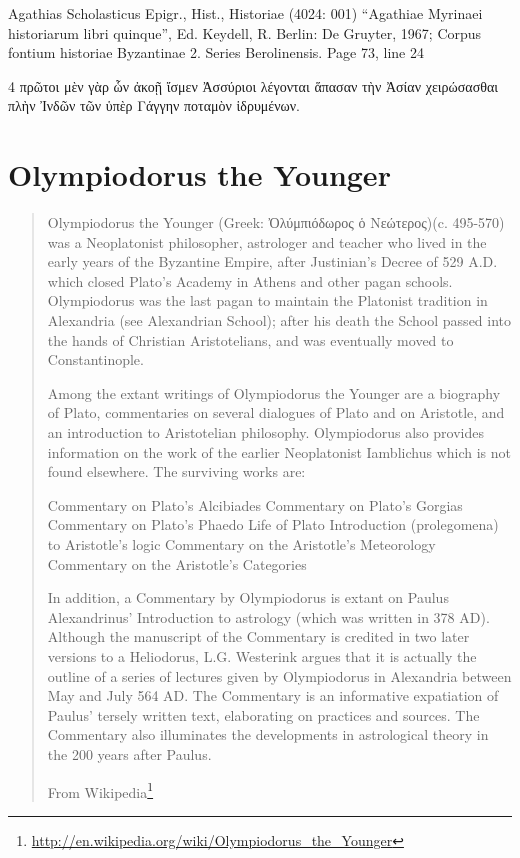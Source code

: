 \documentclass[12pt,letterpaper,twoside,final]{memoir}
\begin{document}
\begin{greek}

Agathias Scholasticus Epigr., Hist., Historiae (4024: 001)
“Agathiae Myrinaei historiarum libri quinque”, Ed. Keydell, R.
Berlin: De Gruyter, 1967; Corpus fontium historiae Byzantinae 2. Series Berolinensis.
Page 73, line 24

                            4 πρῶτοι μὲν γὰρ ὧν ἀκοῇ ἴσμεν Ἀσσύριοι 
λέγονται ἅπασαν τὴν Ἀσίαν χειρώσασθαι πλὴν Ἰνδῶν τῶν ὑπὲρ 
Γάγγην ποταμὸν ἱδρυμένων. 

\end{greek}



\section{Olympiodorus the Younger}

\blockquote[From Wikipedia\footnote{\url{http://en.wikipedia.org/wiki/Olympiodorus_the_Younger}}]{Olympiodorus the Younger (Greek: Ὀλύμπιόδωρος ὁ Νεώτερος)(c. 495-570) was a Neoplatonist philosopher, astrologer and teacher who lived in the early years of the Byzantine Empire, after Justinian's Decree of 529 A.D. which closed Plato's Academy in Athens and other pagan schools. Olympiodorus was the last pagan to maintain the Platonist tradition in Alexandria (see Alexandrian School); after his death the School passed into the hands of Christian Aristotelians, and was eventually moved to Constantinople.

Among the extant writings of Olympiodorus the Younger are a biography of Plato, commentaries on several dialogues of Plato and on Aristotle, and an introduction to Aristotelian philosophy. Olympiodorus also provides information on the work of the earlier Neoplatonist Iamblichus which is not found elsewhere. The surviving works are:

    Commentary on Plato's Alcibiades
    Commentary on Plato's Gorgias
    Commentary on Plato's Phaedo
    Life of Plato
    Introduction (prolegomena) to Aristotle's logic
    Commentary on the Aristotle's Meteorology
    Commentary on the Aristotle's Categories

In addition, a Commentary by Olympiodorus is extant on Paulus Alexandrinus' Introduction to astrology (which was written in 378 AD). Although the manuscript of the Commentary is credited in two later versions to a Heliodorus, L.G. Westerink argues that it is actually the outline of a series of lectures given by Olympiodorus in Alexandria between May and July 564 AD. The Commentary is an informative expatiation of Paulus' tersely written text, elaborating on practices and sources. The Commentary also illuminates the developments in astrological theory in the 200 years after Paulus.
}
\end{document}
